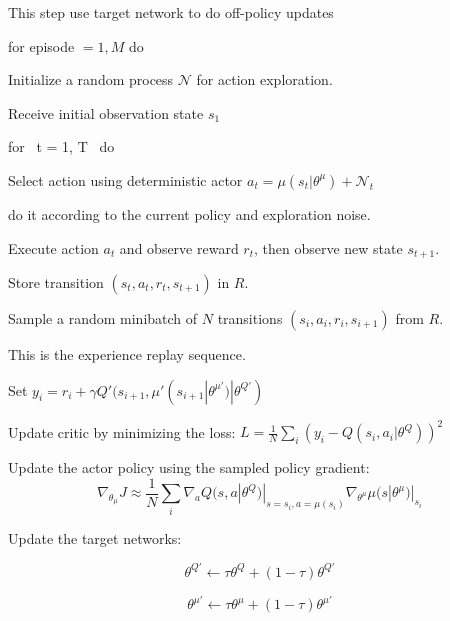 \documentclass[11pt]{amsart}
\begin{document}
This step use target network to do off-policy updates

for episode $= 1, M$ do

\-\hspace{2.5mm}Initialize a random process $\mathcal{N}$ for action exploration.
 
\-\hspace{2.5mm}Receive initial observation state $ s_{1}$ 

\-\hspace{2.5mm}for \,  t = 1, T \, do 

\-\hspace{5mm}Select action using deterministic actor $a_{t} = \mu(s_{t}|\theta^\mu) + \mathcal{N}_{t}$  

\-\hspace{5mm}do it according to the current policy and  exploration noise.

\-\hspace{5mm}Execute action $a_{t}$ and observe reward $r_{t}$, then observe new state $s_{t+1}.$

\-\hspace{5mm}Store transition $ (s_{t},a_{t},r_{t},s_{t+1})$ in  $R$.

\-\hspace{5mm}Sample a random minibatch  of  $N$  transitions $(s_{i},a_{i},r_{i},s_{i+1})$  from  $R$. 

\-\hspace{5mm} This is the experience replay sequence.

\-\hspace{5mm}Set  $y_{i} = r_{i} + \gamma Q'(s_{i+1},\mu'(s_{i+1}|\theta^{\mu'})|\theta^{Q'})$

\-\hspace{5mm}Update critic by minimizing the loss:  $L= \frac{1}{N} \sum_{i}(y_{i} - Q(s_{i},a_{i}|\theta^{Q}))^{2}$

\-\hspace{5mm}Update the actor policy using the sampled policy gradient:
$$\nabla_{\theta_{\mu}} J \approx \frac{1}{N}\sum_{i} \nabla_{a}Q(s,a|\theta^{Q})|_{s=s_{i},a=\mu(s_{i})}\nabla_{\theta^{\mu}}\mu(s|\theta^{\mu})|_{s_{i}}$$

\-\hspace{5mm}Update the target networks: 

$$\theta^{Q'} \leftarrow \tau \theta^{Q} + (1 - \tau ) \theta^{Q'}$$

$$\theta^{\mu'} \leftarrow \tau\theta^{\mu} + (1-\tau)\theta^{\mu'}$$
\end{document}
